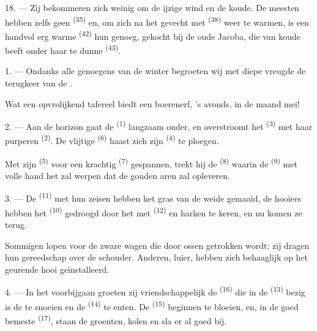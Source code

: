 18. --- Zij bekommeren zich weinig om de ijzige wind en de koude. De meesten hebben zelfs geen
 \textsuperscript{(35)} en, om zich na het gevecht met 
\textsuperscript{(38)} weer te warmen, is een handvol erg warme 
\textsuperscript{(42)} hun genoeg, gekocht bij de oude  Jacoba, die van
koude beeft onder haar te dunne
 \textsuperscript{(43)}.

\VUsaut{3.0mm}
\VUsaut{3.0mm}

\VUsaut{4.0mm}

1. --- Ondanks alle genoegens van de winter begroeten wij met diepe vreugde de terugkeer van
de .

Wat een opvrolijkend tafereel biedt een boerenerf, 's avonds, in de maand mei!

2. --- Aan de horizon gaat de  \textsuperscript{(1)} langzaam onder, en
overstroomt het  \textsuperscript{(3)} met haar purperen
 \textsuperscript{(2)}. De vlijtige 
\textsuperscript{(6)} haast zich zijn  \textsuperscript{(4)} te ploegen.

Met zijn  \textsuperscript{(5)} voor een krachtig 
\textsuperscript{(7)} gespannen, trekt hij de  \textsuperscript{(8)} waarin de
 \textsuperscript{(9)} met volle hand het  zal werpen dat de
gouden aren zal opleveren.

3. --- De  \textsuperscript{(11)} met hun zeisen hebben het gras van de weide
gemaaid, de hooiers hebben het  \textsuperscript{(10)} gedroogd door het met
 \textsuperscript{(12)} en harken te keren, en nu komen ze terug.

Sommigen lopen voor de zware wagen die door ossen getrokken wordt; zij dragen hun gereedschap
over de schouder. Anderen, luier, hebben zich behaaglijk op het geurende hooi geïnstalleerd.

4. --- In het voorbijgaan groeten zij vriendschappelijk de 
\textsuperscript{(16)} die in de  \textsuperscript{(13)} bezig is de
 te snoeien en de  \textsuperscript{(14)} te enten. De
 \textsuperscript{(15)} beginnen te bloeien, en, in de goed bemeste
 \textsuperscript{(17)}, staan de groenten, kolen en sla er al
goed bij.


